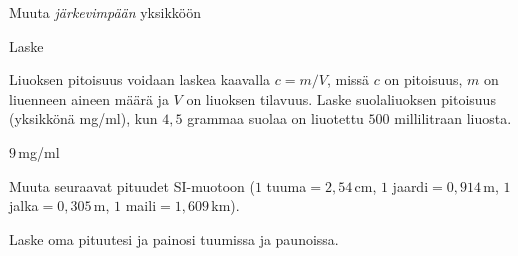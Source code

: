 \begin{tehtavasivu}
\begin{tehtava}
Muuta \emph{järkevimpään} yksikköön
\begin{vastaus}
\end{vastaus}
\end{tehtava}

\begin{tehtava}
Laske
\begin{vastaus}
\end{vastaus}
\end{tehtava}

\begin{tehtava}
Liuoksen pitoisuus voidaan laskea kaavalla $c=m/V$, missä $c$ on pitoisuus, $m$ on liuenneen aineen määrä ja $V$ on liuoksen tilavuus. Laske suolaliuoksen pitoisuus (yksikkönä mg/ml), kun $4,5$ grammaa suolaa on liuotettu $500$ millilitraan liuosta. %
\begin{vastaus}
$9$\,mg/ml
\end{vastaus}
\end{tehtava}

\begin{tehtava}
Muuta seuraavat pituudet SI-muotoon ($1$ tuuma$ = 2,54$\,cm, $1$ jaardi$ = 0,914$\,m, $1$ jalka$ = 0,305$\,m, $1$ maili$ = 1,609$\,km). \\
\begin{vastaus}
\end{vastaus}
\end{tehtava}

\begin{tehtava}
Laske oma pituutesi ja painosi tuumissa ja paunoissa.
\end{tehtava}


\end{tehtavasivu}
